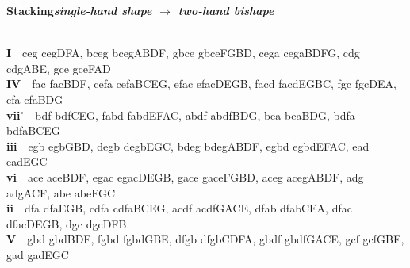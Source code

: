 \documentclass[letterpaper,12pt]{article}
\begin{document}
\begin{multicols}{4}
\noindent\colorbox{hdr4}{\begin{minipage}{\dimexpr\linewidth-2\fboxsep\relax}\raggedright\color{white}\bfseries Stacking\quad\normalfont\itshape single-hand shape $\to$ two-hand bishape\end{minipage}}\\[0.1mm]
\noindent\hangindent=0.25in {\color{lhcol}\bfseries I}~~{\ttfamily ceg cegDFA, bceg bcegABDF, gbce gbceFGBD, cega cegaBDFG, cdg cdgABE, gce gceFAD}\\[0.1mm]
\noindent\hangindent=0.25in {\color{lhcol}\bfseries IV}~~{\ttfamily fac facBDF, cefa cefaBCEG, efac efacDEGB, facd facdEGBC, fgc fgcDEA, cfa cfaBDG}\\[0.1mm]
\noindent\hangindent=0.25in {\color{lhcol}\bfseries vii$^\circ$}~~{\ttfamily bdf bdfCEG, fabd fabdEFAC, abdf abdfBDG, bea beaBDG, bdfa bdfaBCEG}\\[0.1mm]
\noindent\hangindent=0.25in {\color{lhcol}\bfseries iii}~~{\ttfamily egb egbGBD, degb degbEGC, bdeg bdegABDF, egbd egbdEFAC, ead eadEGC}\\[0.1mm]
\noindent\hangindent=0.25in {\color{lhcol}\bfseries vi}~~{\ttfamily ace aceBDF, egac egacDEGB, gace gaceFGBD, aceg acegABDF, adg adgACF, abe abeFGC}\\[0.1mm]
\noindent\hangindent=0.25in {\color{lhcol}\bfseries ii}~~{\ttfamily dfa dfaEGB, cdfa cdfaBCEG, acdf acdfGACE, dfab dfabCEA, dfac dfacDEGB, dgc dgcDFB}\\[0.1mm]
\noindent\hangindent=0.25in {\color{lhcol}\bfseries V}~~{\ttfamily gbd gbdBDF, fgbd fgbdGBE, dfgb dfgbCDFA, gbdf gbdfGACE, gcf gcfGBE, gad gadEGC}\\[0.1mm]
\vspace{1.5mm}


\end{multicols}
\end{document}
